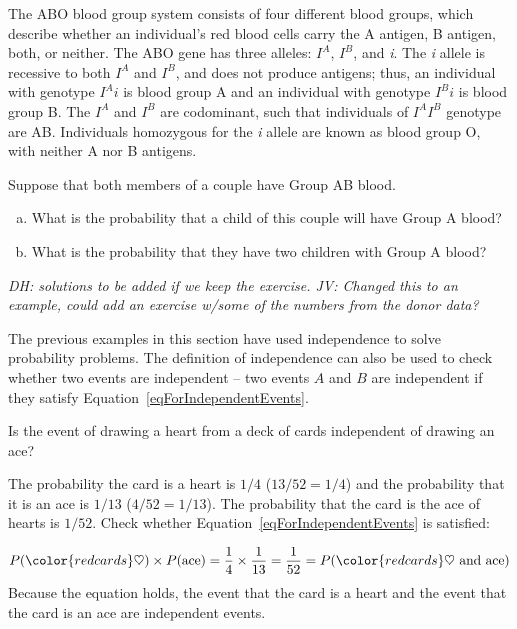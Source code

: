 \begin{doublespace}
\begin{example}
{The ABO blood group system consists of four different blood groups, which describe whether an individual's red blood cells carry the A antigen, B antigen, both, or neither. The ABO gene has three alleles: ${I}^{A}$, ${I}^{B}$, and \textit{i}. The \textit{i} allele is recessive to both ${I}^{A}$ and ${I}^{B}$, and does not produce antigens; thus, an individual with genotype ${I}^{A}i$ is blood group A and an individual with genotype ${I}^{B}i$ is blood group B. The ${I}^{A}$ and ${I}^{B}$ are codominant, such that individuals of ${I}^{A}$${I}^{B}$ genotype are AB. Individuals homozygous for the \textit{i} allele are known as blood group O, with neither A nor B antigens.}

Suppose that both members of a couple have Group AB blood.	
\begin{enumerate}[a)]
	\item What is the probability that a child of this couple will have Group A blood?
	\item What is the probability that they have two children with Group A blood?
\end{enumerate}	

\end{example}

\textit{DH: solutions to be added if we keep the exercise. JV: Changed this to an example, could add an exercise w/some of the numbers from the donor data? }

The previous examples in this section have used independence to solve probability problems. The definition of independence can also be used to check whether two events are independent -- two events $A$ and $B$ are independent if they satisfy Equation~\eqref{eqForIndependentEvents}.

\begin{example}{Is the event of drawing a heart from a deck of cards independent of drawing an ace?}

The probability the card is a heart is $1/4$ ($13/52=1/4$) and the probability that it is an ace is $1/13$ ($4/52=1/13$). The probability that the card is the ace of hearts is $1/52$. Check whether Equation~\ref{eqForIndependentEvents} is satisfied:

\begin{align*}
P({\color{redcards}\heartsuit})\times P(\text{ace}) = \frac{1}{4}\times \frac{1}{13} = \frac{1}{52} 
= P({\color{redcards}\heartsuit}\text{ and ace})
\end{align*}
Because the equation holds, the event that the card is a heart and the event that the card is an ace are independent events.
	

\end{example}
\end{doublespace}
